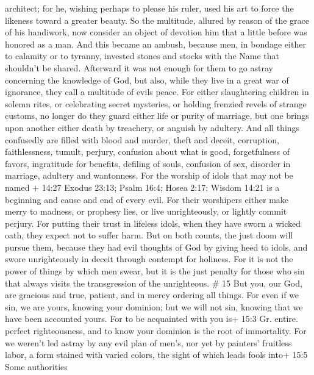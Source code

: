architect;  for he, wishing perhaps to please his ruler,
used his art to force the likeness toward a greater beauty.
 So the multitude, allured by reason of the grace of his
handiwork, now consider an object of devotion him that a little before
was honored as a man.  And this became an ambush, because
men, in bondage either to calamity or to tyranny, invested stones and
stocks with the Name that shouldn't be shared.  Afterward
it was not enough for them to go astray concerning the knowledge of God,
but also, while they live in a great war of ignorance, they call a
multitude of evils peace.  For either slaughtering children
in solemn rites, or celebrating secret mysteries, or holding frenzied
revels of strange customs,  no longer do they guard either
life or purity of marriage, but one brings upon another either death by
treachery, or anguish by adultery.  And all things
confusedly are filled with blood and murder, theft and deceit,
corruption, faithlessness, tumult, perjury,  confusion
about what is good, forgetfulness of favors, ingratitude for benefits,
defiling of souls, confusion of sex, disorder in marriage, adultery and
wantonness.  For the worship of idols that may not be named
+ 14:27 Exodus 23:13; Psalm 16:4; Hosea 2:17; Wisdom 14:21 is a
beginning and cause and end of every evil.  For their
worshipers either make merry to madness, or prophesy lies, or live
unrighteously, or lightly commit perjury.  For putting
their trust in lifeless idols, when they have sworn a wicked oath, they
expect not to suffer harm.  But on both counts, the just
doom will pursue them, because they had evil thoughts of God by giving
heed to idols, and swore unrighteously in deceit through contempt for
holiness.  For it is not the power of things by which men
swear, but it is the just penalty for those who sin that always visits
the transgression of the unrighteous. \# 15  But you, our
God, are gracious and true, patient, and in mercy ordering all things.
 For even if we sin, we are yours, knowing your dominion;
but we will not sin, knowing that we have been accounted yours.
 For to be acquainted with you is+ 15:3 Gr. entire. perfect
righteousness, and to know your dominion is the root of immortality.
 For we weren't led astray by any evil plan of men's, nor
yet by painters' fruitless labor, a form stained with varied colors,
 the sight of which leads fools into+ 15:5 Some authorities
